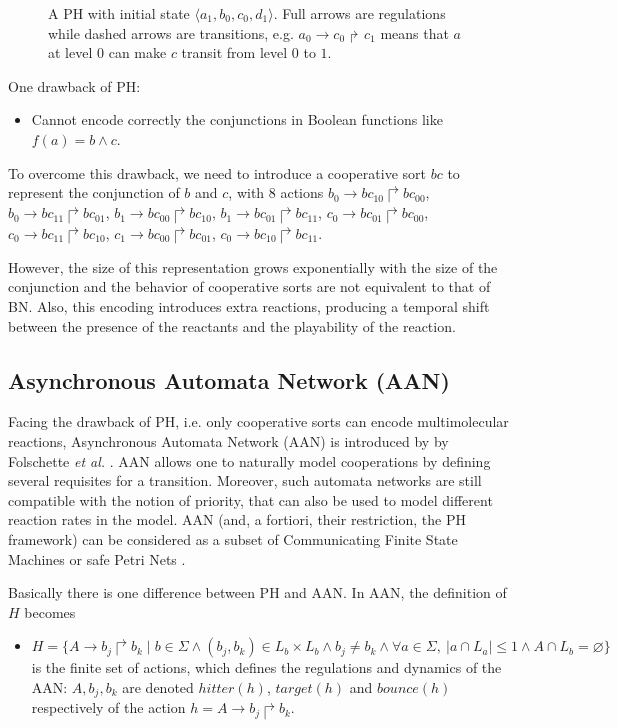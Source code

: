 \begin{figure}[ht]
\centering

\caption[Process Hitting]{A PH with initial state $\langle a_1,b_0,c_0,d_1\rangle$.
Full arrows are regulations while dashed arrows are transitions, e.g. $a_0\to c_0\Rsh c_1$  means that $a$ at level $0$ can make $c$ transit from level $0$ to $1$.}\label{fig:PH}
\end{figure}

One drawback of PH: 

\begin{itemize}
    \item Cannot encode correctly the conjunctions in Boolean functions like $f(a)=b\land c$.
\end{itemize}

To overcome this drawback, we need to introduce a cooperative sort $bc$ to represent the conjunction of $b$ and $c$, with 8 actions $b_0\to bc_{10}\Rsh bc_{00}$, $b_0\to bc_{11}\Rsh bc_{01}$, $b_1\to bc_{00}\Rsh bc_{10}$, $b_1\to bc_{01}\Rsh bc_{11}$, $c_0\to bc_{01}\Rsh bc_{00}$, $c_0\to bc_{11}\Rsh bc_{10}$, $c_1\to bc_{00}\Rsh bc_{01}$, $c_0\to bc_{10}\Rsh bc_{11}$.

However, the size of this representation grows exponentially with the size of the conjunction and the behavior of cooperative sorts are not equivalent to that of BN. 
Also, this encoding introduces extra reactions, producing a temporal shift between the presence of the reactants and the playability of the reaction.

\subsection{Asynchronous Automata Network (AAN)}
Facing the drawback of PH, i.e. only cooperative sorts can encode multimolecular reactions, Asynchronous Automata Network (AAN) is introduced by by Folschette \textit{et al.} \cite{folschette2015}.
AAN allows one to naturally model cooperations by defining several requisites for a transition.
Moreover, such automata networks are still compatible with the notion of priority, that can also be used to model different reaction rates in the model.
AAN (and, a fortiori, their restriction, the PH framework) can be considered as a subset of Communicating Finite State Machines or safe Petri Nets \cite{pauleve2012process}.

Basically there is one difference between PH and AAN. 
In AAN, the definition of $H$ becomes

\begin{itemize}
    \item $H=\{A\to b_j\Rsh b_k\mid b\in \Sigma \land (b_j,b_k)\in L_b\times L_b\land b_j\neq b_k\land \forall a \in \Sigma,\ |a\cap L_a|\leq 1 \land A\cap L_b=\varnothing\}$ is the finite set of actions, which defines the regulations and dynamics of the AAN: $A, b_j, b_k$ are denoted $hitter(h)$, $target(h)$ and $bounce(h)$ respectively of the action $h=A\to b_j\Rsh b_k$.
\end{itemize}




